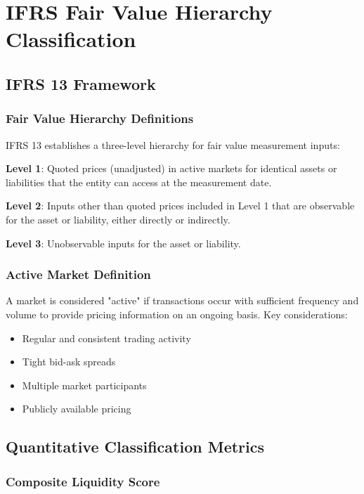 \documentclass[11pt,a4paper]{article}
\begin{document}
\section{IFRS Fair Value Hierarchy Classification}

\subsection{IFRS 13 Framework}

\subsubsection{Fair Value Hierarchy Definitions}

IFRS 13 establishes a three-level hierarchy for fair value measurement inputs:

\textbf{Level 1}: Quoted prices (unadjusted) in active markets for identical assets or liabilities that the entity can access at the measurement date.

\textbf{Level 2}: Inputs other than quoted prices included in Level 1 that are observable for the asset or liability, either directly or indirectly.

\textbf{Level 3}: Unobservable inputs for the asset or liability.

\subsubsection{Active Market Definition}

A market is considered "active" if transactions occur with sufficient frequency and volume to provide pricing information on an ongoing basis. Key considerations:

\begin{itemize}
    \item Regular and consistent trading activity
    \item Tight bid-ask spreads
    \item Multiple market participants
    \item Publicly available pricing
\end{itemize}

\subsection{Quantitative Classification Metrics}

\subsubsection{Composite Liquidity Score}
\end{document}
